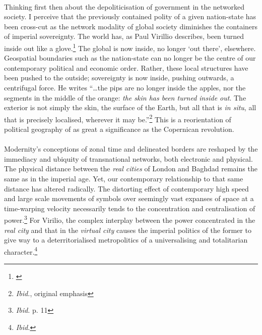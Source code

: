 \documentclass[11pt,titlepage]{book}
\begin{document}
\paragraph{}Thinking first then about the depoliticisation of government in the networked society. I perceive that the previously contained polity of a given nation-state has been cross-cut as the network modality of global society diminishes the containers of imperial sovereignty. The world has, as Paul Virillio describes, been turned inside out like a glove.\footnote{\cite[p. 10]{Virilio:2005jl}} The global is now inside, no longer `out there', elsewhere. Geospatial boundaries such as the nation-state can no longer be the centre of our contemporary political and economic order. Rather, these local structures have been pushed to the outside; sovereignty is now inside, pushing outwards, a centrifugal force.  He writes ``\ldots the pips are no longer inside the apples, nor the segments in the middle of the orange: \textit{the skin has been turned inside out}. The exterior is not simply the skin, the surface of the Earth, but all that is \textit{in situ}, all that is precisely localised, wherever it may be.''\footnote{\textit{Ibid.}, original emphasis} This is a reorientation of political geography of as great a significance as the Copernican revolution.

\paragraph{}Modernity's conceptions of zonal time and delineated borders are reshaped by the immediacy and ubiquity of transnational  networks, both electronic and physical. The physical distance between the \textit{real cities} of London and Baghdad remains the same as in the imperial age. Yet, our contemporary relationship to that same distance has altered radically. The distorting effect of contemporary high speed and large scale movements of symbols over seemingly vast expanses of space at a time-warping velocity necessarily tends to the concentration and centralisation of power.\footnote{\textit{Ibid.} p. 11}  For Virilio, the complex interplay between the power concentrated in the \textit{real city} and that in the \textit{virtual city} causes the imperial politics of the former to give way to a deterritorialised metropolitics of a universalising and totalitarian character.\footnote{\textit{Ibid.}}
\end{document}
